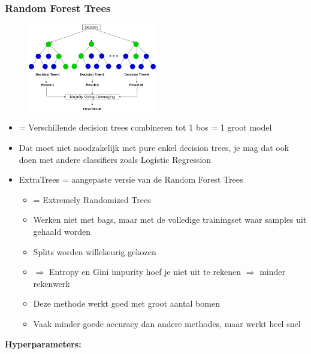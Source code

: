 \documentclass{article}
\begin{document}
\subsubsection{Random Forest Trees}

\begin{figure}[H]
    \centering
    \includegraphics[width=0.5\textwidth]{bagging-random-forest-trees.png}
\end{figure}

\begin{itemize}
    \item = Verschillende decision trees combineren tot 1 bos = 1 groot model
    \item Dat moet niet noodzakelijk met pure enkel decision trees, je mag dat ook doen met andere classifiers zoals Logistic Regression
    \item ExtraTrees = aangepaste versie van de Random Forest Trees
    \begin{itemize}
        \item = Extremely Randomized Trees
        \item Werken niet met bags, maar met de volledige trainingset waar samples uit gehaald worden
        \item Splits worden willekeurig gekozen
        \item $\Rightarrow$ Entropy en Gini impurity hoef je niet uit te rekenen $\Rightarrow$ minder rekenwerk
        \item Deze methode werkt goed met groot aantal bomen
        \item Vaak minder goede accuracy dan andere methodes, maar werkt heel snel
    \end{itemize}
\end{itemize}

\textbf{Hyperparameters:}
\end{document}
